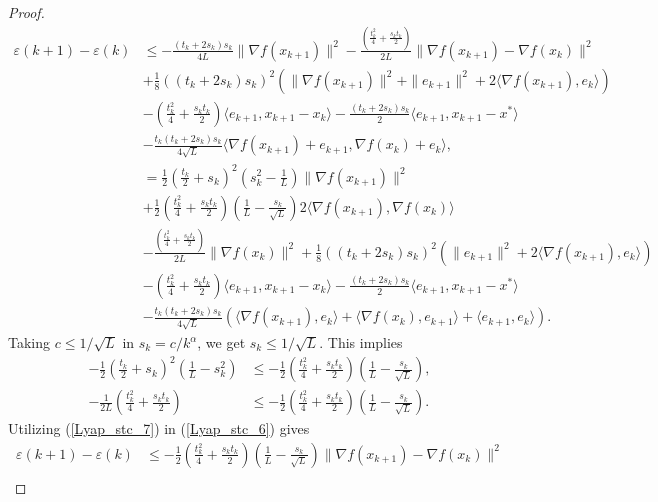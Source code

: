 \documentclass{article}
\theoremstyle{plain}
\theoremstyle{definition}
\theoremstyle{remark}
\begin{document}
\begin{proof}
\begin{align}
            \varepsilon(k+1)-\varepsilon(k)&\leq -\frac{(t_k+2s_k)s_k}{4L} \|\nabla f(x_{k+1})\|^2-\frac{(\frac{t_{k}^2}{4}+\frac{s_{k}t_{k}}{2})}{2L}\|\nabla f(x_{k+1})-\nabla f(x_k)\|^2\nonumber\\
            &+\frac{1}{8}((t_k+2s_k)s_k)^2(\|\nabla f(x_{k+1})\|^2+\|e_{k+1}\|^2+2\langle \nabla f(x_{k+1}) ,e_k \rangle) \nonumber\\
            & -(\frac{t_k^2}{4}+\frac{s_kt_k}{2})\langle e_{k+1},x_{k+1}-x_k\rangle-\frac{(t_k+2s_k)s_k}{2}\langle e_{k+1},x_{k+1}-x^*\rangle\nonumber\\
         & -\frac{t_k(t_k+2s_k)s_k}{4\sqrt{L}}\langle \nabla f(x_{k+1})+e_{k+1}, \nabla f(x_k)+e_k \rangle,\nonumber\\
         &=\frac{1}{2}\left(\frac{t_k}{2}+s_k\right)^2(s_k^2-\frac{1}{L})\|\nabla f(x_{k+1})\|^2\nonumber\\
         &+\frac{1}{2}\left(\frac{t_k^2}{4}+\frac{s_kt_k}{2} \right)(\frac{1}{L}-\frac{s_k}{\sqrt{L}}) 2\langle \nabla f(x_{k+1}),\nabla f(x_k) \rangle\nonumber\\
         &-\frac{(\frac{t_{k}^2}{4}+\frac{s_{k}t_{k}}{2})}{2L}\|\nabla f(x_k)\|^2+\frac{1}{8}((t_k+2s_k)s_k)^2(\|e_{k+1}\|^2+2\langle \nabla f(x_{k+1}) ,e_k \rangle)\nonumber\\
         & -(\frac{t_k^2}{4}+\frac{s_kt_k}{2})\langle e_{k+1},x_{k+1}-x_k\rangle-\frac{(t_k+2s_k)s_k}{2}\langle e_{k+1},x_{k+1}-x^*\rangle\nonumber\\
         &-\frac{t_k(t_k+2s_k)s_k}{4\sqrt{L}}\left(\langle \nabla f(x_{k+1}),e_k \rangle+\langle \nabla f(x_{k}) , e_{k+1}\rangle+\langle e_{k+1},e_k\rangle\right).
        \end{align}
        Taking $c\leq 1/\sqrt{L}$ in $s_k=c/k^{\alpha}$, we get $s_k\leq 1/\sqrt{L}$. This implies 
        \begin{align}\label{Lyap_stc_7}
            -\frac{1}{2}\left(\frac{t_k}{2}+s_k\right)^2(\frac{1}{L}-s_k^2)&\leq -\frac{1}{2}\left(\frac{t_k^2}{4}+\frac{s_kt_k}{2} \right)(\frac{1}{L}-\frac{s_k}{\sqrt{L}}),\nonumber\\
            -\frac{1}{2L}\left(\frac{t_{k}^2}{4}+\frac{s_{k}t_{k}}{2}\right)&\leq -\frac{1}{2}\left(\frac{t_k^2}{4}+\frac{s_kt_k}{2} \right)(\frac{1}{L}-\frac{s_k}{\sqrt{L}}).
        \end{align}
        Utilizing (\ref{Lyap_stc_7}) in (\ref{Lyap_stc_6}) gives
        \begin{align}\label{Lyap_stc_8}
            \varepsilon(k+1)-\varepsilon(k)&\leq -\frac{1}{2}\left(\frac{t_k^2}{4}+\frac{s_kt_k}{2} \right)(\frac{1}{L}-\frac{s_k}{\sqrt{L}})\|\nabla f(x_{k+1})-\nabla f(x_k)\|^2\nonumber\\

\end{align}
\end{proof}
\end{document}
